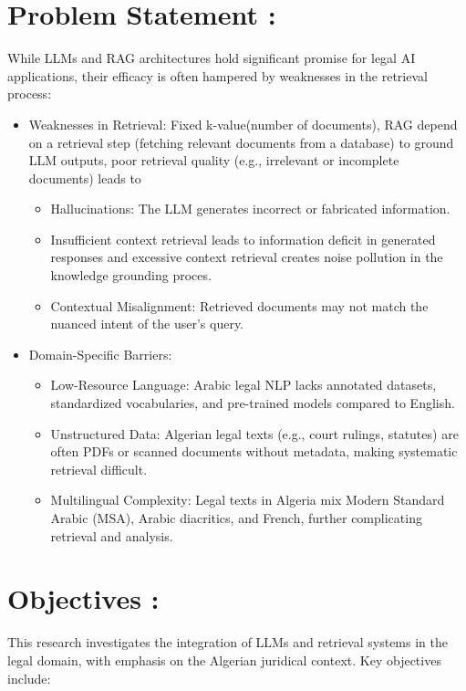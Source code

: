 \section*{Problem Statement :} 
While LLMs and RAG architectures hold significant promise for legal AI applications, their efficacy is often hampered by weaknesses in the retrieval process:

\begin{itemize}
	\item Weaknesses in Retrieval: Fixed k-value(number of documents), RAG depend on a retrieval step (fetching relevant documents from a database) to ground LLM outputs, poor retrieval quality (e.g., irrelevant or incomplete documents) leads to
	\begin{itemize}
		\item Hallucinations: The LLM generates  incorrect or fabricated information.
		\item  Insufficient context retrieval leads to information deficit in generated responses and excessive context retrieval creates noise pollution in the knowledge grounding proces.
		\item Contextual Misalignment: Retrieved documents may not match the nuanced intent of the user’s query.
		
	\end{itemize} 
	\item Domain-Specific Barriers:
	\begin{itemize}
		\item Low-Resource Language: Arabic legal NLP lacks annotated datasets, standardized vocabularies, and pre-trained models compared to English.
		\item Unstructured Data: Algerian legal texts (e.g., court rulings, statutes) are often PDFs or scanned documents without metadata, making systematic retrieval difficult.
		\item Multilingual Complexity: Legal texts in Algeria mix Modern Standard Arabic (MSA), Arabic diacritics, and French, further complicating retrieval and analysis.
	\end{itemize}


\end{itemize}
 \section*{Objectives :} 
This research investigates the integration of LLMs and retrieval systems in the legal domain, with emphasis on the Algerian juridical context. Key objectives include:   

